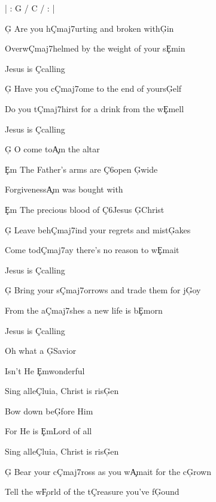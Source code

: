 \documentclass[9pt]{extarticle}
\begin{document}
\bsong

\bi
| : G / C / : |
\ei

\bv
\c{G} Are you h\c{Cmaj7}urting and broken with\c{G}in

Overw\c{Cmaj7}helmed by the weight of your s\c{Em}in

Jesus is \c{C}calling

\c{G} Have you c\c{Cmaj7}ome to the end of yours\c{G}elf

Do you t\c{Cmaj7}hirst for a drink from the w\c{Em}ell

Jesus is \c{C}calling
\ev

\bc
\c{G} O come to\c{Am} the altar

\c{Em} The Father's arms are \c{C6}open \c{G}wide

Forgiveness\c{Am} was bought with

\c{Em} The precious blood of \c{C6}Jesus \c{G}Christ
\ec

\bv
\c{G} Leave beh\c{Cmaj7}ind your regrets and mist\c{G}akes

Come tod\c{Cmaj7}ay there's no reason to w\c{Em}ait

Jesus is \c{C}calling

\c{G} Bring your s\c{Cmaj7}orrows and trade them for j\c{G}oy

From the a\c{Cmaj7}shes a new life is b\c{Em}orn

Jesus is \c{C}calling
\ev


\bb[2]
Oh what a \c{G}Savior

Isn't He \c{Em}wonderful

Sing alle\c{C}luia, Christ is ris\c{G}en

Bow down be\c{G}fore Him

For He is \c{Em}Lord of all

Sing alle\c{C}luia, Christ is ris\c{G}en
\eb


\bo
\c{G} Bear your c\c{Cmaj7}ross as you w\c{Am}ait for the c\c{G}rown

Tell the w\c{F}orld of the t\c{C}reasure you've f\c{G}ound
\eo

\esong
\end{document}
